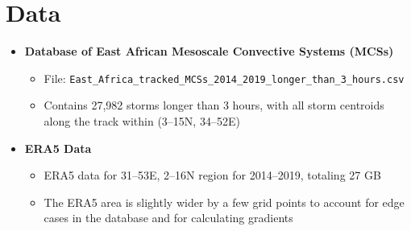 \chapter{Data}
\label{ch:data}

\begin{itemize}
    \item \textbf{Database of East African Mesoscale Convective Systems (MCSs)}
    \begin{itemize}
        \item File: \texttt{East\_Africa\_tracked\_MCSs\_2014\_2019\_longer\_than\_3\_hours.csv}
        \item Contains 27,982 storms longer than 3 hours, with all storm centroids along the track within (3--15N, 34--52E)
    \end{itemize}
    \item \textbf{ERA5 Data}
    \begin{itemize}
        \item ERA5 data for 31--53E, 2--16N region for 2014--2019, totaling 27 GB
        \item The ERA5 area is slightly wider by a few grid points to account for edge cases in the database and for calculating gradients
    \end{itemize}
\end{itemize}